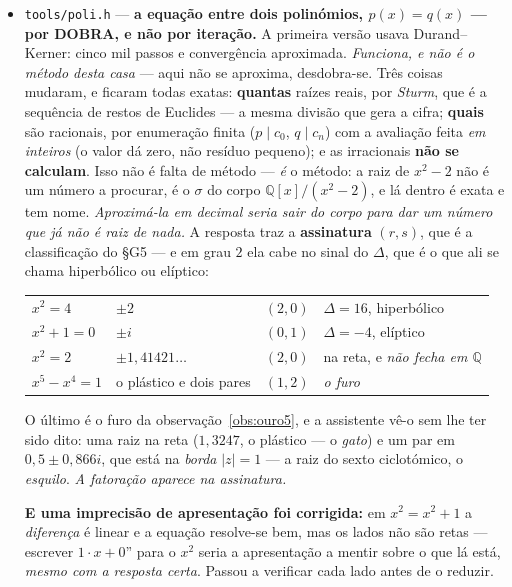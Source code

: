 \documentclass[11pt]{article}
\newcommand{\code}[1]{\texttt{\small #1}}
\newcommand{\Q}{\mathbb Q}
\theoremstyle{plain}
\theoremstyle{remark}
\begin{document}
\begin{itemize}
\textbf{E sem entrada nenhuma, nada se liquida.} O relógio não é um \emph{daemon} a bater por fora:
é alguém a pôr uma entrada. Se ninguém põe, nada corre --- e isso é uma \emph{propriedade}, não uma
falta: \emph{o sistema não tem estado que se mexa sozinho.}

\item \code{tools/poli.h} --- \textbf{a equação entre dois polinómios, $p(x)=q(x)$ --- por
DOBRA, e não por iteração.} A primeira versão usava Durand--Kerner: cinco mil passos e
convergência aproximada. \emph{Funciona, e não é o método desta casa} --- aqui não se aproxima,
desdobra-se. Três coisas mudaram, e ficaram todas exatas: \textbf{quantas} raízes reais, por
\emph{Sturm}, que é a sequência de restos de Euclides --- a mesma divisão que gera a cifra;
\textbf{quais} são racionais, por enumeração finita ($p\mid c_0$, $q\mid c_n$) com a avaliação
feita \emph{em inteiros} (o valor dá zero, não resíduo pequeno); e as irracionais
\textbf{não se calculam}. Isso não é falta de método --- \emph{é} o método: a raiz de $x^2-2$ não
é um número a procurar, é o $\sigma$ do corpo $\Q[x]/(x^2-2)$, e lá dentro é exata e tem nome.
\emph{Aproximá-la em decimal seria sair do corpo para dar um número que já não é raiz de nada.} A resposta traz a \textbf{assinatura} $(r,s)$, que é a classificação do §G5 --- e em
grau $2$ ela cabe no sinal do $\Delta$, que é o que ali se chama hiperbólico ou elíptico:
\begin{center}
\begin{tabular}{llll}
$x^2=4$ & $\pm2$ & $(2,0)$ & $\Delta=16$, hiperbólico \\
$x^2+1=0$ & $\pm i$ & $(0,1)$ & $\Delta=-4$, elíptico \\
$x^2=2$ & $\pm1{,}41421\ldots$ & $(2,0)$ & na reta, e \emph{não fecha em $\Q$} \\
$x^5-x^4=1$ & o plástico e dois pares & $(1,2)$ & \emph{o furo} \\
\end{tabular}
\end{center}
O último é o furo da observação~\ref{obs:ouro5}, e a assistente vê-o sem lhe ter sido dito: uma
raiz na reta ($1{,}3247$, o plástico --- o \emph{gato}) e um par em $0{,}5\pm0{,}866i$, que está na
\emph{borda} $|z|=1$ --- a raiz do sexto ciclotómico, o \emph{esquilo}. \emph{A fatoração aparece
na assinatura.}

\textbf{E uma imprecisão de apresentação foi corrigida:} em $x^2=x^2+1$ a \emph{diferença} é
linear e a equação resolve-se bem, mas os lados não são retas --- escrever $1{\cdot}x+0$'' para o
$x^2$ seria a apresentação a mentir sobre o que lá está, \emph{mesmo com a resposta certa}. Passou
a verificar cada lado antes de o reduzir.


\end{itemize}
\end{document}

